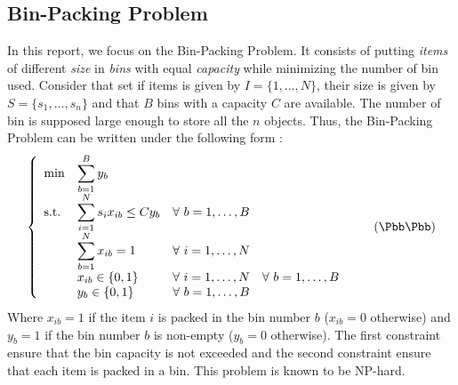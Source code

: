 \subsection{Bin-Packing Problem}

In this report, we focus on the Bin-Packing Problem. It consists of putting \textit{items} of different \textit{size} in \textit{bins} with equal \textit{capacity} while minimizing the number of bin used. Consider that set if items is given by $I = \{1,\dots,N\}$, their size is given by $S = \{s_1,\dots,s_n\}$ and that $B$ bins with a capacity $C$ are available. The number of bin is supposed large enough to store all the $n$ objects. Thus, the Bin-Packing Problem can be written under the following form :
\begin{equation}
	\label{BPP-classic}
	\left \{
	\begin{array}{*5{>{\displaystyle}l}}
	\min & \sum_{b=1}^B{y_b} \\
	\st & \sum_{i=1}^N s_i x_{ib} \leq C y_b & \forall \ b = 1,\dots,B \\
	& \sum_{b=1}^N x_{ib} = 1 & \forall \ i = 1,\dots,N \\
	& x_{ib} \in \{0,1\} & \forall \ i=1,\dots,N & \forall \ b = 1,\dots,B \\
	& y_{b} \in \{0,1\} &  \forall \ b = 1,\dots,B
	\end{array}
	\right.
	\tag{$\Bbb\Pbb\Pbb$}
\end{equation}
Where $x_{ib}=1$ if the item $i$ is packed in the bin number $b$ ($x_{ib}=0$ otherwise) and $y_b=1$ if the bin number $b$ is non-empty ($y_b=0$ otherwise). The first constraint ensure that the bin capacity is not exceeded and the second constraint ensure that each item is packed in a bin. This problem is known to be NP-hard.
